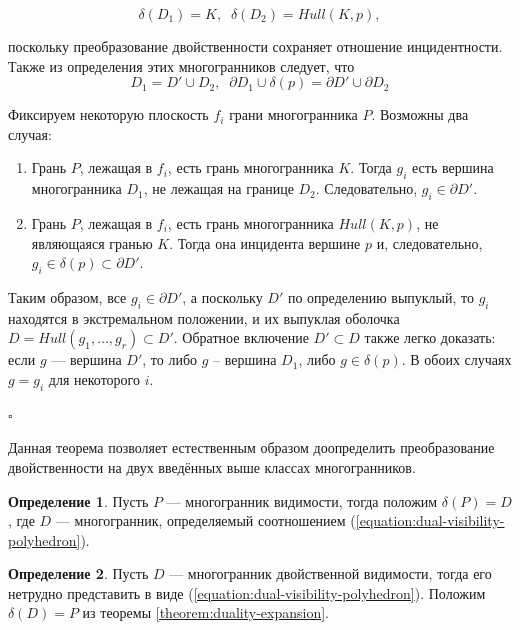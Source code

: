 \documentclass[a4paper, 10pt]{article}
\theoremstyle{definition}
\newtheorem{SmartDefinition}{Определение}
\theoremstyle{plain}
\theoremstyle{plain}
\begin{document}
\begin{equation}
 \delta(D_{1}) = K, \;\; \delta(D_{2}) = Hull(K, p),
\end{equation}

поскольку преобразование двойственности сохраняет отношение инцидентности.
Также из определения этих многогранников следует, что
\begin{equation}
 D_{1} = D' \cup D_{2}, \;\;
 \partial D_{1} \cup \delta(p) = \partial D' \cup \partial D_{2}
\end{equation}

Фиксируем некоторую плоскость $f_{i}$ грани многогранника $P$. Возможны два
случая:

\begin{enumerate}
 \item Грань $P$, лежащая в $f_{i}$, есть грань многогранника $K$. Тогда $g_{i}$
 есть вершина многогранника $D_{1}$, не лежащая на границе $D_{2}$.
 Следовательно, $g_{i} \in \partial D'$.
 \item Грань $P$, лежащая в $f_{i}$, есть грань многогранника $Hull(K, p)$, не
 являющаяся гранью $K$. Тогда она инцидента вершине $p$ и, следовательно,
 $g_{i} \in \delta(p) \subset \partial D'$.
\end{enumerate}

Таким образом, все $g_{i} \in \partial D'$, а поскольку $D'$ по определению
выпуклый, то $g_{i}$ находятся в экстремальном положении, и их выпуклая оболочка
$D = Hull(g_{1}, \ldots, g_{r}) \subset D'$. Обратное включение $D' \subset D$
также легко доказать: если $g$ --- вершина $D'$, то либо $g$ -- вершина $D_{1}$,
либо $g \in \delta(p)$. В обоих случаях $g = g_{i}$ для некоторого $i$.

$\square$

Данная теорема позволяет естественным образом доопределить преобразование
двойственности на двух введённых выше классах многогранников.

\begin{SmartDefinition}
 Пусть $P$ --- многогранник видимости, тогда положим $\delta(P) = D$, где $D$
 --- многогранник, определяемый соотношением
 (\ref{equation:dual-visibility-polyhedron}).
\end{SmartDefinition}
\begin{SmartDefinition}
 Пусть $D$ --- многогранник двойственной видимости, тогда его нетрудно
 представить в виде (\ref{equation:dual-visibility-polyhedron}). Положим
 $\delta(D) = P$ из теоремы \ref{theorem:duality-expansion}.
\end{SmartDefinition}
\end{document}

